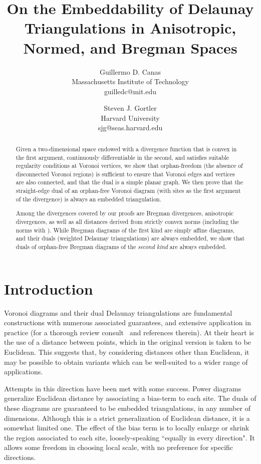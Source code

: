 \documentclass[11pt]{article}
\title{On the Embeddability of Delaunay Triangulations in Anisotropic, Normed, and Bregman Spaces}
\author{Guillermo D. Canas\\Massachusetts Institute of Technology\\guilledc@mit.edu
\and Steven J. Gortler\\Harvard University\\sjg@seas.harvard.edu}
\date{}
\begin{document}
\maketitle


\begin{abstract}






Given a two-dimensional space endowed with a divergence function that is convex in the first argument, 
	continuously differentiable in the second, 
	and satisfies suitable regularity conditions at Voronoi vertices, 
we show that orphan-freedom (the absence of disconnected Voronoi regions) is sufficient 
	to ensure that Voronoi edges and vertices are also connected, and 
	that the dual is a simple planar graph. 
We then prove that the straight-edge dual of an orphan-free Voronoi diagram 
		(with sites as the first argument of the divergence) is always an embedded triangulation. 






Among the divergences covered by our proofs are Bregman divergences, 
	anisotropic divergences, 
	as well as all distances derived from strictly convex   norms 
	(including the  norms with ). 
While Bregman diagrams of the {first kind} are simply affine diagrams, 
	and their duals ({weighted} Delaunay triangulations) are always embedded, 
	we show that duals of orphan-free Bregman diagrams of the \emph{second kind} are always embedded. 	
	


\end{abstract}

\newpage

\section{Introduction}


Voronoi diagrams and their dual Delaunay triangulations are fundamental constructions with
numerous associated guarantees, and extensive application in
practice (for a thorough review consult~\cite{Aurenhammer13} and references therein).
At their heart is the use of a distance between points, which in the original
version is taken to be Euclidean. 
This suggests that, by considering 
distances other than Euclidean, 
it may be possible to obtain variants which can be well-suited to
a wider range of applications.  

Attempts in this direction have been met with some success. 
Power diagrams~\cite{power} generalize Euclidean distance by associating 
a {bias-term}
to each 
site. The duals of these diagrams
are  
guaranteed to be embedded triangulations, in any number of
dimensions. 
Although this is a strict generalization of Euclidean distance, it is a somewhat 
limited one. The effect of the bias term is to locally enlarge or shrink the
region associated to each site, loosely-speaking ``equally in every
direction". It allows some freedom in choosing local scale, with no
preference for specific directions. 
\end{document}
